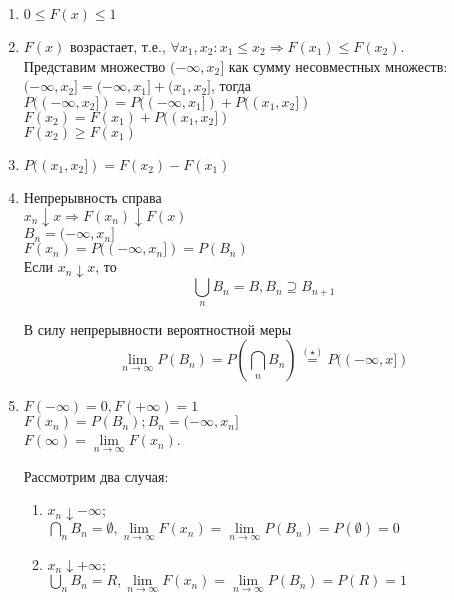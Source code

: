 \begin{enumerate}
  \item $0\leqslant F(x)\leqslant 1$

  \item $F(x)$ возрастает, т.е., $\forall x_1, x_2: x_1 \leq x_2 \Rightarrow F(x_1) \leqslant F(x_2)$.\\
    Представим множество $(-\infty, x_2]$ как сумму несовместных множеств:\\
    $(-\infty, x_2]=(-\infty, x_1]+(x_1, x_2]$, тогда $P((-\infty, x_2]) = P((-\infty, x_1])+P((x_1, x_2])$\\
    $F(x_2)=F(x_1)+P((x_1, x_2])$\\
    $F(x_2)\geqslant F(x_1)$

  \item $P((x_1, x_2]) = F(x_2)-F(x_1)$

  \item Непрерывность справа\\
    $x_n\downarrow x\Rightarrow F(x_n)\downarrow F(x)$\\
    $B_n = (-\infty, x_n]$\\
    $F(x_n)=P((-\infty, x_n])=P(B_n)$\\
    Если $x_n\downarrow x$, то
    \begin{equation}
      \tag{$\star$}
      \bigcup\limits_n B_n = B, B_n \supseteq B_{n+1}
    \end{equation}

    В силу непрерывности вероятностной меры
    \begin{displaymath}
      \lim\limits_{n\rightarrow\infty} P(B_n) = P(\bigcap\limits_n B_n)\stackrel{(\star)}{=}P((-\infty, x])
    \end{displaymath}

  \item $F(-\infty)=0, F(+\infty)=1$\\
    $F(x_n)=P(B_n); B_n=(-\infty, x_n]$\\
    $F(\infty)=\lim\limits_{n\rightarrow\infty} F(x_n)$.

    Рассмотрим два случая:
    \begin{enumerate}
      \item $x_n\downarrow -\infty$;\\
        $\bigcap\limits_n B_n=\emptyset, \lim\limits_{n\rightarrow\infty} F(x_n) = \lim\limits_{n\rightarrow\infty} P(B_n) = P(\emptyset) = 0$

      \item $x_n\downarrow +\infty$;\\
        $\bigcup\limits_n B_n=R, \lim\limits_{n\rightarrow\infty} F(x_n) = \lim\limits_{n\rightarrow\infty} P(B_n) = P(R) = 1$
    \end{enumerate}
\end{enumerate}
